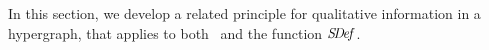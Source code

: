 In this section, we develop a related principle for qualitative information in a hypergraph, that applies to both \scibility\ and the function $\mathit{S\mskip-3.5muD\mskip-2.5mue\mskip-1.5muf}$.
%
%
%
%
%
%

